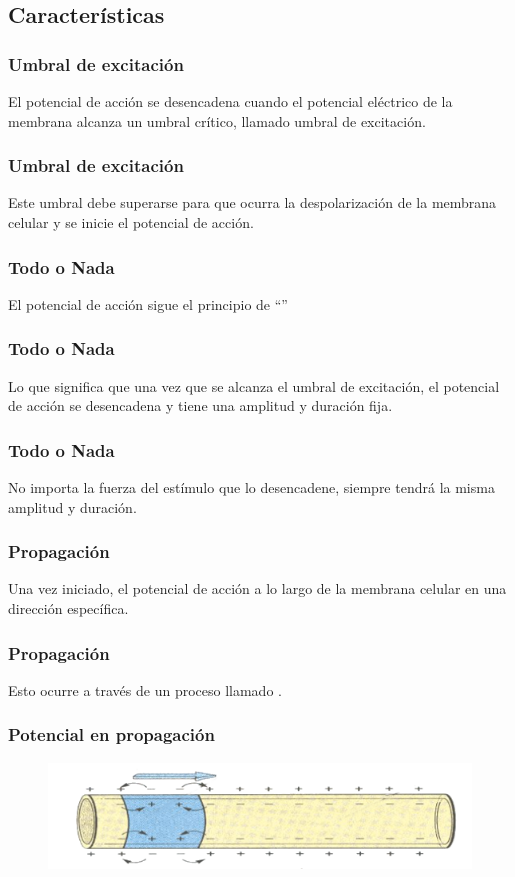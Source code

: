 \documentclass[14pt]{beamer}
\begin{document}
\subsection{Características}

\begin{frame}
\frametitle{Umbral de excitación}
El potencial de acción se desencadena cuando el potencial eléctrico de la membrana alcanza un umbral crítico, llamado umbral de excitación.
\end{frame}
\begin{frame}
\frametitle{Umbral de excitación}
Este umbral debe superarse para que ocurra la despolarización de la membrana celular y se inicie el potencial de acción.
\end{frame}
\begin{frame}
\frametitle{Todo o Nada}
El potencial de acción sigue el principio de \enquote{}
\end{frame}
\begin{frame}
\frametitle{Todo o Nada}
Lo que significa que una vez que se alcanza el umbral de excitación, \pause el potencial de acción se desencadena y tiene una amplitud y duración fija.
\end{frame}
\begin{frame}
\frametitle{Todo o Nada}
No importa la fuerza del estímulo que lo desencadene, siempre tendrá la misma amplitud y duración.
\end{frame}
\begin{frame}
\frametitle{Propagación}
Una vez iniciado, el potencial de acción  a lo largo de la membrana celular en una dirección específica.
\end{frame}
\begin{frame}
\frametitle{Propagación}
Esto ocurre a través de un proceso llamado .
\end{frame}
\begin{frame}
\frametitle{Potencial en propagación}
\begin{figure}
    \centering
    \includegraphics[scale=0.7]{Imagenes/Potencial_Accion_09a.png}
\end{figure}
\end{frame}
\end{document}
